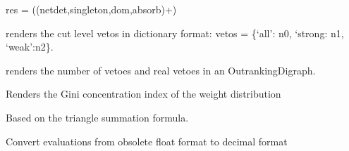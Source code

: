 \documentclass[letterpaper,10pt,english]{sphinxmanual}
\begin{document}
\begin{fulllineitems}
\begin{fulllineitems}
res = ((netdet,singleton,dom,absorb)+)

\end{fulllineitems}


\begin{fulllineitems}
\label{techDoc:outrankingDigraphs.OutrankingDigraph.computeVetoesStatistics}
renders the cut level vetos in dictionary format:
vetos = \{`all': n0, `strong: n1, `weak':n2\}.

\end{fulllineitems}


\begin{fulllineitems}
\label{techDoc:outrankingDigraphs.OutrankingDigraph.computeVetosShort}
renders the number of vetoes and real vetoes in an OutrankingDigraph.

\end{fulllineitems}


\begin{fulllineitems}
\label{techDoc:outrankingDigraphs.OutrankingDigraph.computeWeightsConcentrationIndex}
Renders the Gini concentration index of the weight distribution

Based on the triangle summation formula.

\end{fulllineitems}


\begin{fulllineitems}
\label{techDoc:outrankingDigraphs.OutrankingDigraph.convertEvaluationFloatToDecimal}
Convert evaluations from obsolete float format to decimal format

\end{fulllineitems}



\end{fulllineitems}
\end{document}
